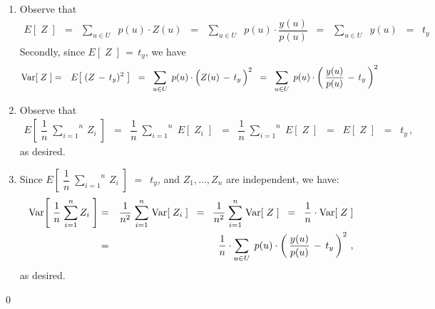 \proof
\begin{enumerate}
\item
	Observe that
	\begin{eqnarray*}
	E\!\left[\;Z\;\right]
	&=&
		\underset{u \in U}{\sum}\;\; p(u) \cdot Z(u)
	\;\; = \;\;
		\underset{u \in U}{\sum}\;\; p(u) \cdot \dfrac{y(u)}{p(u)}
	\;\; = \;\;
		\underset{u \in U}{\sum}\;\; y(u)
	\;\; = \;\;
		t_{y}
	\end{eqnarray*}
	Secondly, since \;$E\!\left[\;Z\;\right] \,=\, t_{y}$,\; we have
	\begin{eqnarray*}
	\Var\!\left[\;Z\;\right]
	&=&
		E\!\left[\;(Z\,-\,t_{y})^{2}\;\right]	
	\;\; = \;\;
		\underset{u \in U}{\sum}\;\, p(u)\cdot\left(\overset{{\color{white}.}}{Z}(u)\,-\,t_{y}\,\right)^{2}
	\;\; = \;\;
		\underset{u \in U}{\sum}\;\, p(u)\cdot\left(\,\dfrac{y(u)}{p(u)}\,-\,t_{y}\,\right)^{2}
	\end{eqnarray*}
\item
	Observe that
	\begin{eqnarray*}
	E\!\left[\;\dfrac{1}{n}\;\overset{n}{\underset{i=1}{\sum}}\,Z_{i}\;\right]
	&=&
		\dfrac{1}{n}\;\overset{n}{\underset{i=1}{\sum}}\;E\!\left[\;Z_{i}\;\right]
	\;\; = \;\;
		\dfrac{1}{n}\;\overset{n}{\underset{i=1}{\sum}}\;E\!\left[\;Z\;\right]
	\;\; = \;\;
		E\!\left[\;Z\;\right]
	\;\; = \;\;
		t_{y}\,,
	\end{eqnarray*}
	as desired.
\item
	Since \;$E\!\left[\;\dfrac{1}{n}\;\overset{n}{\underset{i=1}{\sum}}\,Z_{i}\;\right]$ $=$\, $t_{y}$,\;
	and \;$Z_{1}, \ldots, Z_{n}$\; are independent, we have:
	\begin{eqnarray*}
	\textnormal{Var}\!\left[\;\dfrac{1}{n}\;\overset{n}{\underset{i=1}{\sum}}\,Z_{i}\;\right]
	&=&
		\dfrac{1}{n^{2}}\;\overset{n}{\underset{i=1}{\sum}}\;\textnormal{Var}\!\left[\;Z_{i}\;\right]
	\;\; = \;\;
		\dfrac{1}{n^{2}}\;\overset{n}{\underset{i=1}{\sum}}\;\textnormal{Var}\!\left[\;Z\;\right]
	\;\; = \;\;
		\dfrac{1}{n}\cdot\textnormal{Var}\!\left[\;Z\;\right]
	\\
	&=&
		\dfrac{1}{n}\cdot
		\underset{u \in U}{\sum}\;\, p(u)\cdot\left(\,\dfrac{y(u)}{p(u)}\,-\,t_{y}\,\right)^{2}\,,
	\end{eqnarray*}
	as desired.
\end{enumerate}
\qed


\renewcommand{\theenumi}{\roman{enumi}}
\renewcommand{\labelenumi}{\textnormal{(\theenumi)}$\;\;$}

